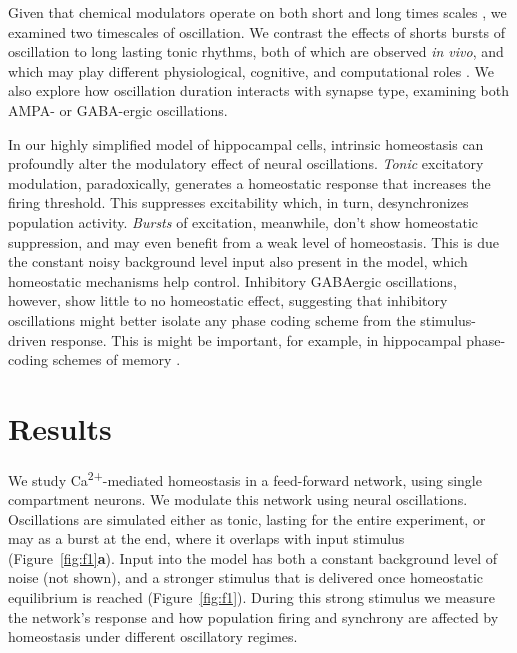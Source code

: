 \documentclass{article}
\begin{document}
Given that chemical modulators operate on both short and long times scales \cite{Marinelli2014,Marder2014,Cohen2015,Daw2002}, we examined two timescales of oscillation. We contrast the effects of shorts bursts of oscillation to long lasting tonic rhythms, both of which are observed {\textit{in vivo}}, and which may play different physiological, cognitive, and computational roles \cite{Lundqvist2016,vanEde2018}. We also explore how oscillation duration interacts with synapse type, examining both AMPA- or GABA-ergic oscillations.

In our highly simplified model of hippocampal cells, intrinsic homeostasis can profoundly alter the modulatory effect of neural oscillations. \textit{Tonic} excitatory modulation, paradoxically, generates a homeostatic response that increases the firing threshold. This suppresses excitability which, in turn, desynchronizes population activity. \textit{Bursts} of excitation, meanwhile, don't show homeostatic suppression, and may even benefit from a weak level of homeostasis. This is due the constant noisy background level input also present in the model, which homeostatic mechanisms help control. Inhibitory GABAergic oscillations, however, show little to no homeostatic effect, suggesting that inhibitory oscillations might better isolate any phase coding scheme from the stimulus-driven response. This is might be important, for example, in hippocampal phase-coding schemes of memory \cite{Lisman2013}. 

\section*{Results}
We study Ca\textsuperscript{2+}-mediated homeostasis in a feed-forward network, using single compartment neurons. We modulate this network using neural oscillations. Oscillations are simulated either as tonic, lasting for the entire experiment, or may as a burst at the end, where it overlaps with input stimulus (Figure~\ref{fig:f1}\textbf{a}). Input into the model has both a constant background level of noise (not shown), and a stronger stimulus that is delivered once homeostatic equilibrium is reached \cite{Barth2012} (Figure~\ref{fig:f1}). During this strong stimulus we measure the network's response and how population firing and synchrony are affected by homeostasis under different oscillatory regimes.
\end{document}
